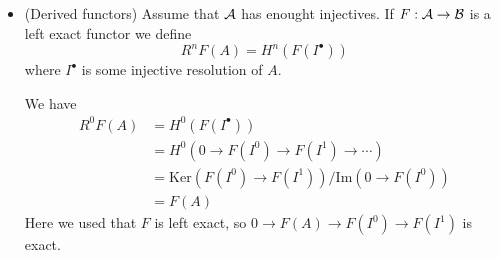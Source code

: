\begin{itemize}
     \begin{definition}
        We say that $\callC$ has enough injectives if for any $A\in\callC$ there exists an injective object $I\in\callC$ 
        and a monomorphism $f:A\to I$.
     \end{definition}
    \begin{proposition}
        If $\callC$ has enough injectives, then any $A\in\callC$ has a injective resolution.
    \end{proposition}
    Proof: Draw the diagram 
    \begin{center}
    \end{center}
    and repeat
    \begin{center}
    \end{center}
    etc...\qed
    \item(Derived functors)
    Assume that $\mathcal{A}$ has enought injectives. If $F:\mathcal{A}\to\mathcal{B}$ is a left exact functor we define 
    \begin{equation}
        R^nF(A) = H^n(F(I^\bullet))
    \end{equation}
    where $I^\bullet$ is some injective resolution of $A$. 
    \begin{remark}
        We have 
        \begin{equation}
            \begin{split}
                R^0F(A) &= H^0(F(I^\bullet))\\
                &=H^0(0\to F(I^0)\to F(I^1)\to\cdots)\\
                &=\text{Ker}(F(I^0)\to F(I^1))/\text{Im}(0\to F(I^0))\\
                &=F(A)
            \end{split}
        \end{equation}
        Here we used that $F$ is left exact, so $0\to F(A)\to F(I^0)\to F(I^1)$ is exact.
    \end{remark}


\end{itemize}
